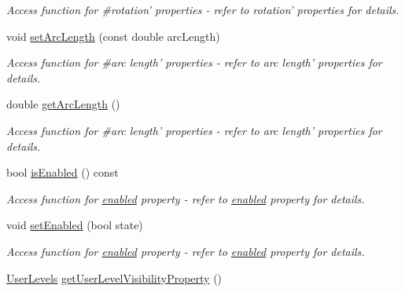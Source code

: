 \begin{DoxyCompactItemize}
\begin{DoxyCompactList}\small\item\em Access function for \#rotation' properties -\/ refer to rotation' properties for details. \end{DoxyCompactList}\item 
\hypertarget{classQEShape_ae08169c43eb35787300103a837901c2b}{
void \hyperlink{classQEShape_ae08169c43eb35787300103a837901c2b}{setArcLength} (const double arcLength)}
\label{classQEShape_ae08169c43eb35787300103a837901c2b}

\begin{DoxyCompactList}\small\item\em Access function for \#arc length' properties -\/ refer to arc length' properties for details. \end{DoxyCompactList}\item 
\hypertarget{classQEShape_ab92a3458a5fe39be138e81c7bdea3d4a}{
double \hyperlink{classQEShape_ab92a3458a5fe39be138e81c7bdea3d4a}{getArcLength} ()}
\label{classQEShape_ab92a3458a5fe39be138e81c7bdea3d4a}

\begin{DoxyCompactList}\small\item\em Access function for \#arc length' properties -\/ refer to arc length' properties for details. \end{DoxyCompactList}\item 
\hypertarget{classQEShape_a73d794f3b085aba052469a10d570349a}{
bool \hyperlink{classQEShape_a73d794f3b085aba052469a10d570349a}{isEnabled} () const }
\label{classQEShape_a73d794f3b085aba052469a10d570349a}

\begin{DoxyCompactList}\small\item\em Access function for \hyperlink{classQEShape_a15eb8c61fc2f76a3c3118f26f5a29f5e}{enabled} property -\/ refer to \hyperlink{classQEShape_a15eb8c61fc2f76a3c3118f26f5a29f5e}{enabled} property for details. \end{DoxyCompactList}\item 
\hypertarget{classQEShape_aa45555b8c65c26fd8ebeae305450f7aa}{
void \hyperlink{classQEShape_aa45555b8c65c26fd8ebeae305450f7aa}{setEnabled} (bool state)}
\label{classQEShape_aa45555b8c65c26fd8ebeae305450f7aa}

\begin{DoxyCompactList}\small\item\em Access function for \hyperlink{classQEShape_a15eb8c61fc2f76a3c3118f26f5a29f5e}{enabled} property -\/ refer to \hyperlink{classQEShape_a15eb8c61fc2f76a3c3118f26f5a29f5e}{enabled} property for details. \end{DoxyCompactList}\item 
\hypertarget{classQEShape_a958d82762b2d412c39a5a5a32f4a1ae2}{
\hyperlink{classQEShape_a090921156d1b46560ff0fc1bacad18dd}{UserLevels} \hyperlink{classQEShape_a958d82762b2d412c39a5a5a32f4a1ae2}{getUserLevelVisibilityProperty} ()}
\label{classQEShape_a958d82762b2d412c39a5a5a32f4a1ae2}


\end{DoxyCompactItemize}
